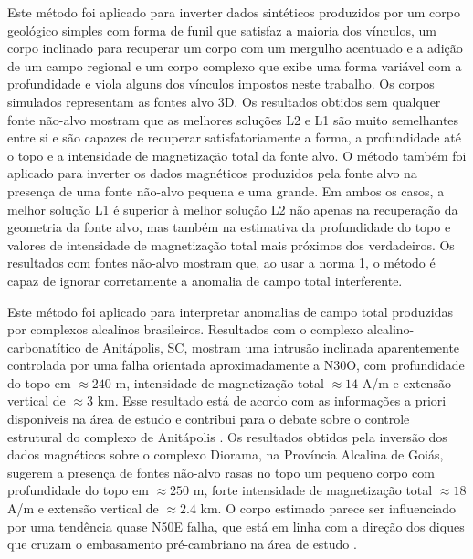Este método foi aplicado para inverter dados sintéticos produzidos por um corpo geológico simples com forma de funil que satisfaz a maioria dos vínculos, um corpo inclinado para recuperar um corpo com um mergulho acentuado e a adição de um campo regional e um corpo complexo que exibe uma forma variável com a profundidade e viola alguns dos vínculos impostos neste trabalho.
Os corpos simulados representam as fontes alvo 3D.
Os resultados obtidos sem qualquer fonte não-alvo mostram que as melhores soluções L2 e L1 são muito semelhantes entre si e são capazes de recuperar satisfatoriamente a forma, a profundidade até o topo e a intensidade de magnetização total da fonte alvo.
O método também foi aplicado para inverter os dados magnéticos produzidos pela fonte alvo na presença de uma fonte não-alvo pequena e uma grande.
Em ambos os casos, a melhor solução L1 é superior à melhor solução L2 não apenas na recuperação da geometria da fonte alvo, mas também na estimativa da profundidade do topo e valores de intensidade de magnetização total mais próximos dos verdadeiros.
Os resultados com fontes não-alvo mostram que, ao usar a norma 1, o método é capaz de ignorar corretamente a anomalia de campo total interferente.

Este método foi aplicado para interpretar anomalias de campo total produzidas por complexos alcalinos brasileiros. Resultados com o complexo alcalino-carbonatítico de Anitápolis, SC, mostram uma intrusão inclinada aparentemente controlada por uma falha orientada aproximadamente a N30O, com profundidade do topo em $\approx 240$ m, intensidade de magnetização total $\approx 14$ A/m e extensão vertical de $\approx 3$ km. Esse resultado está de acordo com as informações a priori disponíveis na área de estudo e contribui para o debate sobre o controle estrutural do complexo de Anitápolis \citep{riccomini_etal2005, gomes_etal2018}.
Os resultados obtidos pela inversão dos dados magnéticos sobre o complexo Diorama, na Província Alcalina de Goiás, sugerem a presença de fontes não-alvo rasas no topo um pequeno corpo com profundidade do topo em $\approx 250$ m, forte intensidade de magnetização total $\approx 18$ A/m e extensão vertical de $\approx 2.4$ km. O corpo estimado parece ser influenciado por uma tendência quase N50E falha, que está em linha com a direção dos diques que cruzam o embasamento pré-cambriano na área de estudo \citet{junqueirabrod_etal2002}.